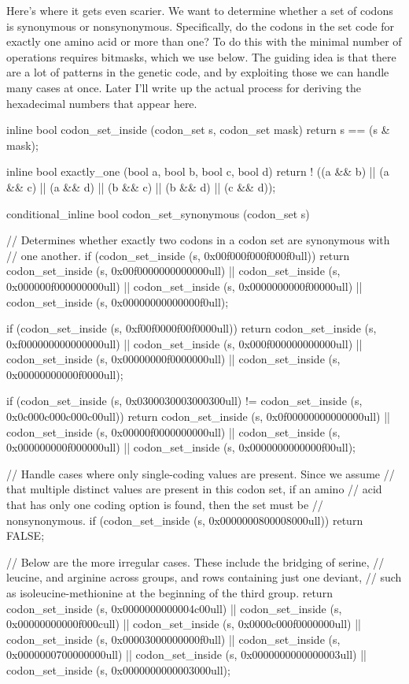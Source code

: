 \documentclass{article}
\begin{document}
      Here's where it gets even scarier. We want to determine whether a set of
      codons is synonymous or nonsynonymous. Specifically, do the codons in the
      set code for exactly one amino acid or more than one? To do this with the
      minimal number of operations requires bitmasks, which we use below. The
      guiding idea is that there are a lot of patterns in the genetic code, and
      by exploiting those we can handle many cases at once. Later I'll write up
      the actual process for deriving the hexadecimal numbers that appear here.

\begin{ccode}
inline bool codon_set_inside (codon_set s, codon_set mask)
  {return s == (s & mask);}

inline bool exactly_one (bool a, bool b, bool c, bool d) {
  return ! ((a && b) || (a && c) || (a && d) ||
          (b && c) || (b && d) || (c && d));
}

conditional_inline bool codon_set_synonymous (codon_set s) {
  // Determines whether exactly two codons in a codon set are synonymous with
  // one another.
  if (codon_set_inside (s, 0x00f000f000f000f0ull))
    return codon_set_inside (s, 0x00f0000000000000ull) ||
	   codon_set_inside (s, 0x000000f000000000ull) ||
	   codon_set_inside (s, 0x0000000000f00000ull) ||
	   codon_set_inside (s, 0x00000000000000f0ull);

  if (codon_set_inside (s, 0xf00f0000f00f0000ull))
    return codon_set_inside (s, 0xf000000000000000ull) ||
	   codon_set_inside (s, 0x000f000000000000ull) ||
	   codon_set_inside (s, 0x00000000f0000000ull) ||
	   codon_set_inside (s, 0x00000000000f0000ull);

  if (codon_set_inside (s, 0x0300030003000300ull) !=
      codon_set_inside (s, 0x0c000c000c000c00ull))
    return codon_set_inside (s, 0x0f00000000000000ull) ||
	   codon_set_inside (s, 0x00000f0000000000ull) ||
	   codon_set_inside (s, 0x000000000f000000ull) ||
	   codon_set_inside (s, 0x0000000000000f00ull);

  // Handle cases where only single-coding values are present. Since we assume
  // that multiple distinct values are present in this codon set, if an amino
  // acid that has only one coding option is found, then the set must be
  // nonsynonymous.
  if (codon_set_inside (s, 0x0000000800008000ull))
    return FALSE;

  // Below are the more irregular cases. These include the bridging of serine,
  // leucine, and arginine across groups, and rows containing just one deviant,
  // such as isoleucine-methionine at the beginning of the third group.
  return  codon_set_inside (s, 0x0000000000004c00ull) ||
	  codon_set_inside (s, 0x00000000000f000cull) ||
	  codon_set_inside (s, 0x0000c000f0000000ull) ||
	  codon_set_inside (s, 0x00003000000000f0ull) ||
	  codon_set_inside (s, 0x0000000700000000ull) ||
	  codon_set_inside (s, 0x0000000000000003ull) ||
	  codon_set_inside (s, 0x0000000000003000ull);
}
\end{ccode}
\end{document}
